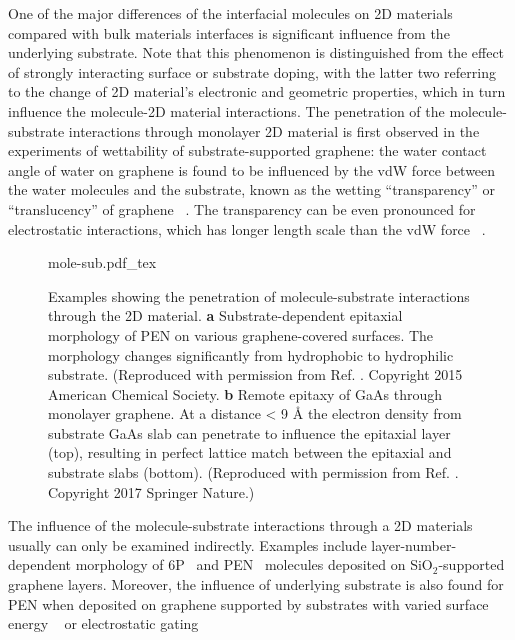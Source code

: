 One of the major differences of the interfacial molecules on 2D
materials compared with bulk materials interfaces is significant
influence from the underlying substrate. Note that this phenomenon is
distinguished from the effect of strongly interacting surface or
substrate doping, with the latter two referring to the change of 2D
material's electronic and geometric properties, which in turn influence
the molecule-2D material interactions. The penetration of the
molecule-substrate interactions through monolayer 2D material is first
observed in the experiments of wettability of substrate-supported
graphene: the water contact angle of water on graphene is found to be
influenced by the vdW force between the water molecules and the
substrate, known as the wetting ``transparency'' or ``translucency''
of graphene
~\autocite{rafiee_2012_transparency,Shih_2012_prl,shih_2013_wetting_natmat}. The
transparency can be even pronounced for electrostatic interactions,
which has longer length scale than the vdW force
~\autocite{Shih_2015_PartiallyScreened,Tian_2016_multiscale}.
\begin{figure}[h]
  \centering
  {mole-sub.pdf_tex}
  \caption{\label{fig:intro-mol-sub}%
    Examples showing the penetration of molecule-substrate
    interactions through the 2D material. \textbf{a}
    Substrate-dependent epitaxial morphology of PEN on various
    graphene-covered surfaces. The morphology changes significantly
    from hydrophobic to hydrophilic substrate. (Reproduced with
    permission from Ref. \cite{Nguyen_2015_pent_gr_wett}. Copyright
    2015 American Chemical Society. \textbf{b} Remote epitaxy of GaAs
    through monolayer graphene. At a distance < 9 Å the electron
    density from substrate GaAs slab can penetrate to influence the
    epitaxial layer (top), resulting in perfect lattice match between
    the epitaxial and substrate slabs (bottom).  (Reproduced with
    permission from Ref. \cite{Kim_2017_remote_epi_Gr}. Copyright 2017
    Springer Nature.)%
  }
\end{figure}
The
influence of the molecule-substrate interactions through a 2D
materials usually can only be examined indirectly.
%
Examples include layer-number-dependent morphology of
6P~\autocite{Kratzer_2014_6P_gr_layer} and
PEN~\autocite{Chhikara_2014_gr_pent_trans} molecules deposited on
SiO\(_{\text{2}}\)-supported graphene layers. Moreover, the influence
of underlying substrate is also found for PEN when deposited on
graphene supported by substrates with varied surface energy
~\autocite{Nguyen_2015_pent_gr_wett} or electrostatic gating
